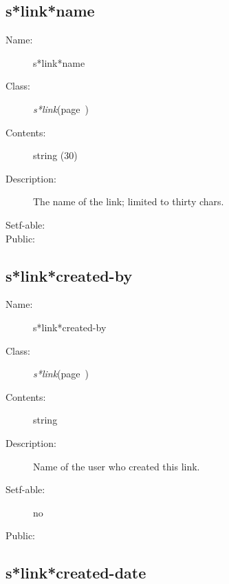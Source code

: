 \subsection{s*link*name}
\label{s*link*name}

\begin{description}
\item [Name:]  s*link*name

\item [Class:] {\sl s*link}\hfill(page~\pageref{s*link})

\item [Contents:] string (30)

\item [Description:]
The name of the link; limited to thirty chars.

\item [Setf-able:]

\item [Public:]



\end{description}
\horizontalline

\subsection{s*link*created-by}
\label{s*link*created-by}

\begin{description}
\item [Name:]  s*link*created-by

\item [Class:] {\sl s*link}\hfill(page~\pageref{s*link})

\item [Contents:] string

\item [Description:] 
Name of the user who created this link.

\item [Setf-able:] no

\item [Public:]



\end{description}
\horizontalline

\subsection{s*link*created-date}
\label{s*link*created-date}

